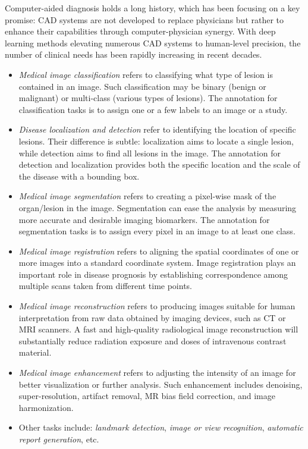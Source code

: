 Computer-aided diagnosis holds a long history, which has been focusing on a key promise: CAD systems are not developed to replace physicians but rather to enhance their capabilities through computer-physician synergy. With deep learning methods elevating numerous CAD systems to human-level precision, the number of clinical needs has been rapidly increasing in recent decades.

\begin{itemize}
    \item \textit{Medical image classification} refers to classifying what type of lesion is contained in an image. Such classification may be binary (\eg benign or malignant) or multi-class (various types of lesions). The annotation for classification tasks is to assign one or a few labels to an image or a study.
    
    \item \textit{Disease localization and detection} refer to identifying the location of specific lesions. Their difference is subtle: localization aims to locate a single lesion, while detection aims to find all lesions in the image. The annotation for detection and localization provides both the specific location and the scale of the disease with a bounding box.
    
    \item \textit{Medical image segmentation} refers to creating a pixel-wise mask of the organ/lesion in the image. Segmentation can ease the analysis by measuring more accurate and desirable imaging biomarkers. The annotation for segmentation tasks is to assign every pixel in an image to at least one class.
    
    \item \textit{Medical image registration} refers to aligning the spatial coordinates of one or more images into a standard coordinate system. Image registration plays an important role in disease prognosis by establishing correspondence among multiple scans taken from different time points. 
    
    \item \textit{Medical image reconstruction} refers to producing images suitable for human interpretation from raw data obtained by imaging devices, such as CT or MRI scanners. A fast and high-quality radiological image reconstruction will substantially reduce radiation exposure and doses of intravenous contrast material.
    
    \item \textit{Medical image enhancement} refers to adjusting the intensity of an image for better visualization or further analysis. Such enhancement includes denoising, super-resolution, artifact removal, MR bias field correction, and image harmonization.
    
    \item Other tasks include: \textit{landmark detection}, \textit{image or view recognition}, \textit{automatic report generation}, etc.

\end{itemize}


